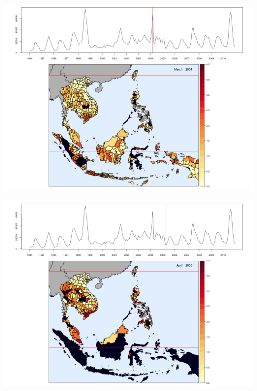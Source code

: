 \begin{center}
\begin{minipage}{0.5\textwidth}
\includegraphics[width=\linewidth]{../figures/chap2/Test123.png}
\label{fig2e}
\end{minipage}\hfill
\begin{minipage}{0.5\textwidth}
\includegraphics[width=\linewidth]{../figures/chap2/Test136.png} 
\label{fig2f}
\end{minipage}
\begin{minipage}{0.5\textwidth}

\end{minipage}
\end{center}
